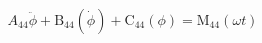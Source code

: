 \begin{equation} \label{eq:roll_equation_himeno}
A_{44} \ddot{\phi} + \operatorname{B_{44}}\left(\dot{\phi}\right) + \operatorname{C_{44}}\left(\phi\right) = \operatorname{M_{44}}\left(\omega t\right)
\end{equation}
